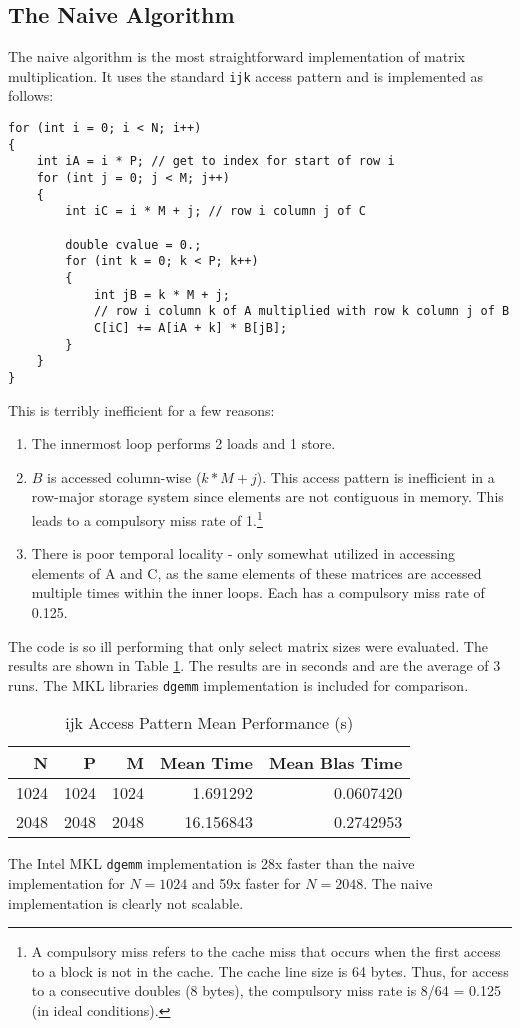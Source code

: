 \documentclass{article}
\begin{document}
\subsection{The Naive Algorithm}
The naive algorithm is the most straightforward implementation of matrix multiplication. 
It uses the standard \texttt{ijk} access pattern and is implemented as follows:
\begin{lstlisting}
for (int i = 0; i < N; i++)
{
    int iA = i * P; // get to index for start of row i
    for (int j = 0; j < M; j++)
    {
        int iC = i * M + j; // row i column j of C

        double cvalue = 0.;
        for (int k = 0; k < P; k++)
        {
            int jB = k * M + j;
            // row i column k of A multiplied with row k column j of B
            C[iC] += A[iA + k] * B[jB];
        }
    }
}
\end{lstlisting}
\noindent This is terribly inefficient for a few reasons:
\begin{enumerate}
    \item The innermost loop performs 2 loads and 1 store.
    \item $B$ is accessed column-wise (\(k * M + j\)). This access pattern is inefficient in a row-major storage system since elements are not contiguous in memory. This leads to a compulsory miss rate of 1.\footnote{
        A compulsory miss refers to the cache miss that occurs when the first access to a block is not in the cache. The cache line size is 64 bytes. Thus, for access 
        to a consecutive doubles (8 bytes), the compulsory miss rate is 8/64 = 0.125 (in ideal conditions).
    }
    \item There is poor temporal locality - only somewhat utilized in accessing elements of A and C, as the same elements of these matrices are accessed multiple times within the inner loops. Each has a compulsory miss rate of 0.125.
\end{enumerate}
The code is so ill performing that only select matrix sizes were evaluated. The 
results are shown in Table \ref{TAB:NAIVE-RESULTS}. The results are in seconds and
are the average of 3 runs. The MKL libraries \texttt{dgemm} implementation is included for comparison. 
\begin{table}[H]
    \centering
    \caption{ijk Access Pattern Mean Performance (s)}
    \fontsize{12}{14}\selectfont
    \begin{tabular}[t]{rrrrr}
    \toprule
    N & P & M & Mean Time & Mean Blas Time\\
    \midrule
    1024 & 1024 & 1024 & 1.691292 & 0.0607420\\
    2048 & 2048 & 2048 & 16.156843 & 0.2742953\\
    \bottomrule
    \end{tabular}
    \label{TAB:NAIVE-RESULTS}
\end{table}
\noindent The Intel MKL \texttt{dgemm} implementation is 28x faster than the naive implementation for $N = 1024$ and 59x faster for $N = 2048$. The naive implementation is clearly not scalable.
\end{document}
